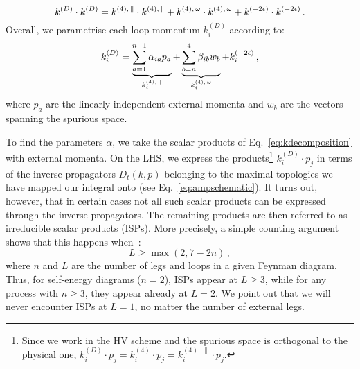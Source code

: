\documentclass[main.tex]{subfiles}
\begin{document}
\begin{equation} \label{eq:ksquared}
    k^{(D)} \cdot k^{(D)}  = k^{(4),\, \parallel} \cdot k^{(4),\, \parallel} + k^{(4),\, \omega} \cdot k^{(4),\, \omega} + k^{(-2\epsilon)} \cdot k^{(-2\epsilon)}\,.
\end{equation}
Overall, we parametrise each loop momentum $k_i^{(D)}$ according to:
\begin{equation} \label{eq:kdecomposition}
    k_i^{(D)} = \underbrace{\sum_{a=1}^{n-1} \alpha_{ia} p_a}_{k_i^{(4),\,\parallel}} + \underbrace{\sum_{b=n}^{4} \beta_{ib} w_b}_{k_i^{(4),\,\omega}} + k_i^{(-2\epsilon)}\,,
\end{equation}
where $p_a$ are the linearly independent external momenta and $w_b$ are the vectors spanning the spurious space. 

To find the parameters $\alpha$, we take the scalar products of Eq.~\ref{eq:kdecomposition} with external momenta. On the LHS, we express the products\footnote{Since we work in the HV scheme and the spurious space is orthogonal to the physical one, $k_i^{(D)} \cdot p_j = k_i^{(4)} \cdot p_j = k_i^{(4),\,\parallel} \cdot p_j$.} $k_i^{(D)} \cdot p_j$ in terms of the inverse propagators $D_t(k,p)$ belonging to the maximal topologies we have mapped our integral onto (see Eq.~\ref{eq:ampschematic}). It turns out, however, that in certain cases not all such scalar products can be expressed through the inverse propagators. The remaining products are then referred to as irreducible scalar products (ISPs). More precisely, a simple counting argument shows that this happens when~\cite{grozin:2011mt}:
\begin{equation}
    L \ge \max (2, 7-2n)\,,
\end{equation}
where $n$ and $L$ are the number of legs and loops in a given Feynman diagram. Thus, for self-energy diagrams ($n=2$), ISPs appear at $L\ge3$, while for any process with $n\ge3$, they appear already at $L=2$. We point out that we will never encounter ISPs at $L=1$, no matter the number of external legs.
\end{document}
